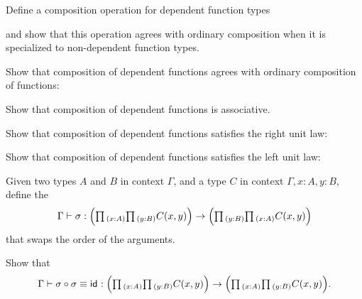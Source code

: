 \begin{exercises}
\begin{subexenum}
\item Define a composition operation for dependent function types
  \begin{prooftree}
\end{prooftree}
and show that this operation agrees with ordinary composition when it is specialized to non-dependent function types.
\item Show that composition of dependent functions agrees with ordinary composition of functions:
  \begin{prooftree}
  \end{prooftree}
\item Show that composition of dependent functions is associative.
\item Show that composition of dependent functions satisfies the right unit law:
\begin{prooftree}
\end{prooftree}
\item Show that composition of dependent functions satisfies the left unit law:
\begin{prooftree}
\end{prooftree}
\end{subexenum}
\exercise \label{ex:swap}
\begin{subexenum}
\item Given two types $A$ and $B$ in context $\Gamma$, and a type $C$ in context $\Gamma,x:A,y:B$, define the 
\begin{equation*}
\Gamma\vdash \sigma:\Big(\prd{x:A}\prd{y:B}C(x,y)\Big)\to\Big(\prd{y:B}\prd{x:A}C(x,y)\Big)
\end{equation*}
that swaps the order of the arguments.
\item Show that
\begin{equation*}
\Gamma\vdash \sigma\circ\sigma\jdeq\idfunc:\Big(\prd{x:A}\prd{y:B}C(x,y)\Big)\to \Big(\prd{x:A}\prd{y:B}C(x,y)\Big).
\end{equation*}
\end{subexenum}
\end{exercises}
